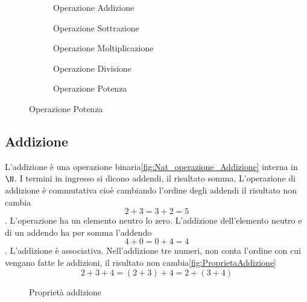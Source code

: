 \begin{figure}
	\begin{subfigure}[b]{.5\linewidth}
		\centering

	\caption{Operazione Addizione}
	\label{fig:Nat_operazione_Addizione}
	\end{subfigure}%
	\begin{subfigure}[b]{.5\linewidth}
	\centering

	\caption{Operazione Sottrazione}
	\label{fig:Nat_operazione_Sottrazione}
	\end{subfigure}
	\begin{subfigure}[b]{.5\linewidth}
	\centering

	\caption{Operazione Moltiplicazione}
	\label{fig:Nat_operazione_Moltiplicazione}
	\end{subfigure}
	\begin{subfigure}[b]{.5\linewidth}
	\centering

	\caption{Operazione Divisione}
	\label{fig:Nat_operazione_Divisione}
	\end{subfigure}
		\begin{subfigure}[b]{.5\linewidth}
		\centering
	
		\caption{Operazione Potenza}
		\label{fig:Nat_operazione_Potenza}
		\end{subfigure}
	\label{fig:OPerzioni in N}
\end{figure}
\subsection{Addizione}
\label{sec:NumerinatADD}
L'addizione è una operazione binaria\nobs\vref{fig:Nat_operazione_Addizione}  interna in $\N$. I termini in ingresso si dicono addendi, il risultato somma. L'operazione di  addizione è commutativa cioè cambiando l'ordine degli addendi il risultato non cambia \[2+3=3+2=5\]. L'operazione ha un elemento neutro lo zero. L'addizione dell'elemento neutro e di un addendo ha per somma l'addendo  \[4+0=0+4=4\]. L'addizione è associativa. Nell'addizione tre numeri, non conta l'ordine con cui vengano fatte le addizioni, il risultato non cambia\nobs\vref{fig:ProprietaAddizione}\[2+3+4=(2+3)+4=2+(3+4)\]
\begin{figure} %
	\centering

	\caption{Proprietà addizione}
	\label{fig:ProprietaAddizione}\end{figure}
